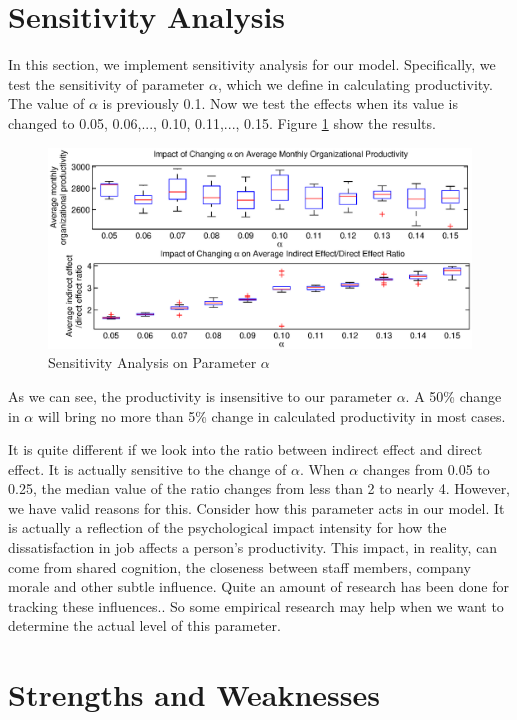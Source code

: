 \documentclass[tcn = 37075, sheet = false, abstract = false]{mcmthesis}
\begin{document}
\section{Sensitivity Analysis}

In this section, we implement sensitivity analysis for our model. Specifically, we test the sensitivity of parameter $\alpha$, which we define in calculating productivity. The value of $\alpha$ is previously 0.1. Now we test the effects when its value is changed to 0.05, 0.06,..., 0.10, 0.11,..., 0.15. Figure \ref{fig:sa} show the results. 

\begin{figure}[htb!]
\centering
\includegraphics[width=16cm]{Sensitivity.eps}
\caption{Sensitivity Analysis on Parameter $\alpha$} 
\label{fig:sa}
\end{figure}

As we can see, the productivity is insensitive to our parameter $\alpha$. A 50\% change in $\alpha$ will bring no more than 5\% change in calculated productivity in most cases. 

It is quite different if we look into the ratio between indirect effect and direct effect. It is actually sensitive to the change of $\alpha$. When $\alpha$ changes from 0.05 to 0.25, the median value of the ratio changes from less than 2 to nearly 4. However, we have valid reasons for this. Consider how this parameter acts in our model. It is actually a reflection of the psychological impact intensity for how the dissatisfaction in job affects a person's productivity. This impact, in reality, can come from shared cognition, the closeness between staff members, company morale and other subtle influence. Quite an amount of research has been done for tracking these influences.\cite{seligman2000positive}. So some empirical research may help when we want to determine the actual level of this parameter.

\section{Strengths and Weaknesses}
\end{document}

